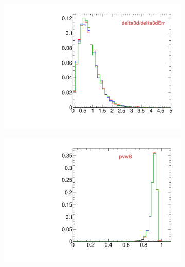 \begin{figure}
\begin{subfigure}[b]{0.2\textwidth}
                \includegraphics[width=\textwidth]{Figures/VariablesComparison/MC_endcaps_figs_3h/delta3d/delta3dErr}
                \label{fig:MC_endcaps_delta3d/delta3dErr_3h}
        \end{subfigure}
        \begin{subfigure}[b]{0.2\textwidth}
                \centering
                \includegraphics[width=\textwidth]{Figures/VariablesComparison/MC_endcaps_figs_3h/pvw8}
                \label{fig:MC_endcaps_pvw8_3h}
        \end{subfigure}
        \begin{subfigure}[b]{0.2\textwidth}
                \centering

\end{subfigure}
\end{figure}
